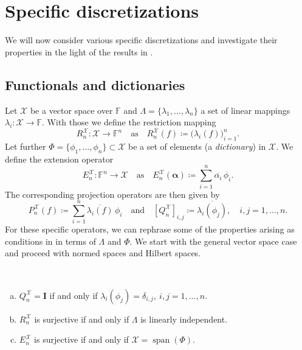 \documentclass[a4paper]{paper}
\newcommand*{\SPC}[1]{{\ensuremath{\mathscr{#1}}}}
\newcommand*{\SPCX}{\SPC{X}}
\newcommand{\FIELD}{{\ensuremath{\mathbb{F}}}}
\newcommand*{\Fn}{{\ensuremath{\FIELD^n}}}
\newcommand*{\EXT}[2]{\ensuremath{E_{#1}^{#2}}}
\newcommand*{\REST}[2]{\ensuremath{R_{#1}^{#2}}}
\newcommand*{\PROJ}[2]{\ensuremath{P_{#1}^{#2}}}
\newcommand*{\COPROJ}[2]{\ensuremath{Q_{#1}^{#2}}}
\newcommand*{\RnX}{{\ensuremath{\REST{n}{\SPC{X}}}}}
\newcommand*{\EnX}{{\ensuremath{\EXT{n}{\SPC{X}}}}}
\newcommand*{\PnX}{{\ensuremath{\PROJ{n}{\SPCX}}}}
\newcommand*{\QnX}{{\ensuremath{\COPROJ{n}{\SPCX}}}}
\DeclareMathOperator{\SPAN}{span}
\DeclareMathOperator{\DEFEQ}{{\coloneqq}}
\newcommand{\valpha}{\boldsymbol{\alpha}}
\newcommand{\vI}{\boldsymbol{I}}
\begin{document}
\section{Specific discretizations}
\label{sec:specif}

We will now consider various specific discretizations and investigate their properties in the light of the 
results in .



\subsection{Functionals and dictionaries}
\label{subsec:specif:funct}

Let $\SPCX$ be a vector space over $\FIELD$ and $\Lambda = \{\lambda_1, \dots, \lambda_n\}$ a set of linear mappings
$\lambda_i \colon \SPCX \to \FIELD$. With those we define the restriction mapping
%
\begin{equation*}
 \RnX \colon \SPCX \to \Fn \quad \text{as} \quad \RnX(f) \DEFEQ  \big( \lambda_i(f) \big)_{i=1}^n.
\end{equation*}
%
Let further $\Phi=\{\phi_1, \dots, \phi_n\} \subset \SPCX$ be a set of elements (a \emph{dictionary}) in $\SPCX$. We 
define the extension operator
%
\begin{equation*}
 \EnX \colon \Fn \to \SPCX \quad \text{as} \quad \EnX(\valpha) \DEFEQ  \sum_{i=1}^n \overline{\alpha_i}\, \phi_i.
\end{equation*}
%
The corresponding projection operators are then given by
%
\begin{equation*}
 \PnX(f) \DEFEQ  \sum_{i=1}^n \overline{\lambda_i(f)}\, \phi_i
 \quad \text{and} \quad
 \left[ \QnX \right]_{i,j} \DEFEQ  \overline{\lambda_i(\phi_j)},\quad i,j=1,\dots,n.
\end{equation*}
%
For these specific operators, we can rephrase some of the properties arising as conditions in  
in terms of $\Lambda$ and $\Phi$. We start with the general vector space case and proceed with normed spaces and 
Hilbert spaces.


\begin{lemma}~
 \label{lemma:specif:funct:op_prop_vecspace}
 \begin{enumerate}[(a)]
  \item \label{lemma:specif:funct:op_prop_vecspace:Q_identity}
  $\QnX = \vI$ if and only if $\lambda_i(\phi_j) = \delta_{i,j},\ i,j=1,\dots,n$.
  
  \item \label{lemma:specif:funct:op_prop_vecspace:R_surjective}
  $\RnX$ is surjective if and only if $\Lambda$ is linearly independent.
  
  \item \label{lemma:specif:funct:op_prop_vecspace:E_surjective}
  $\EnX$ is surjective if and only if $\SPCX = \SPAN(\Phi)$.
 \end{enumerate}
\end{lemma}
\vspace{1em}
\end{document}
